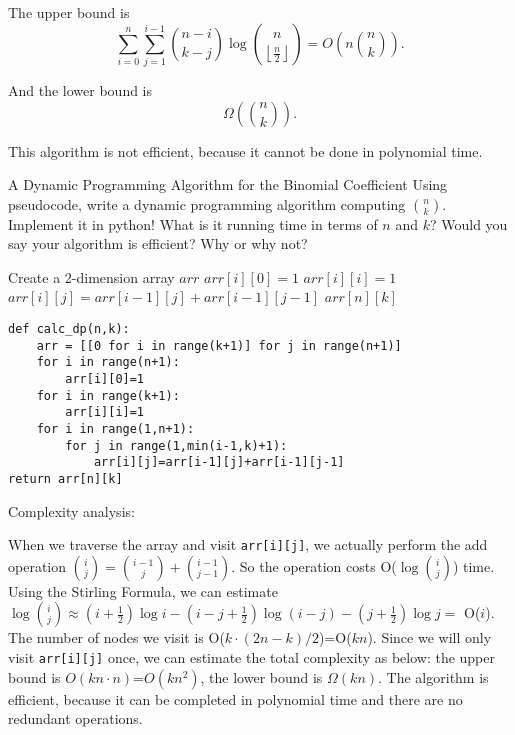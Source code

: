\documentclass[UTF8, a4paper, linespread=1.5]{article}
\begin{document}
The upper bound is
$$\sum_{i=0}^n\sum_{j=1}^{i-1} \binom {n-i}{k-j} \log  \binom n {\left\lfloor \frac{n}{2} \right\rfloor } = O(n \binom n k).$$

And the lower bound is
$$\Omega(\binom nk).$$

This algorithm is not efficient, because it cannot be done in polynomial time.
\newpage
\begin{thm}{A Dynamic Programming Algorithm for the Binomial Coefficient}{}
    Using pseudocode, 
    write a dynamic programming algorithm computing  $\binom{n}{k}$.  Implement it in python!  What is it running 
    time in terms of $n$ and $k$? Would you say your algorithm is efficient?  Why or why not?
    
\end{thm}
\begin{algorithm}
    \caption{Caluculate Binomial Coefficient Using DP}
    \begin{algorithmic}
        \STATE Create a 2-dimension array $arr$
        \STATE $arr[i][0]=1$
        \ENDFOR
        \STATE $arr[i][i]=1$
        \ENDFOR
        \STATE $arr[i][j]=arr[i-1][j]+arr[i-1][j-1]$
        \ENDFOR
        \ENDFOR
        \RETURN $arr[n][k]$
    \end{algorithmic}
\end{algorithm}
\begin{verbatim}
def calc_dp(n,k):
    arr = [[0 for i in range(k+1)] for j in range(n+1)]
    for i in range(n+1):
        arr[i][0]=1
    for i in range(k+1):
        arr[i][i]=1
    for i in range(1,n+1):
        for j in range(1,min(i-1,k)+1):
            arr[i][j]=arr[i-1][j]+arr[i-1][j-1]
return arr[n][k]
\end{verbatim}
Complexity analysis:

 When we traverse the array and visit \texttt{arr[i][j]}, we actually perform the add operation $\binom{i}{j}=\binom{i-1}{j}+\binom{i-1}{j-1}$. So the operation costs O($\log\binom{i}{j}$) time. Using the Stirling Formula, we can estimate $\log\binom{i}{j}\approx(i+\frac{1}{2})\log i-(i-j+\frac{1}{2})\log (i-j)-(j+\frac{1}{2})\log j =$ O($i$). The number of nodes we visit is O($k\cdot (2n-k)/2$)=O($kn$). Since we will only visit \texttt{arr[i][j]} once, we can estimate the total complexity as below: the upper bound is $O(kn\cdot n)$=$O(kn^2)$, the lower bound is $\Omega(kn)$. The algorithm is efficient, because it can be completed in polynomial time and there are no redundant operations.
\end{document}
